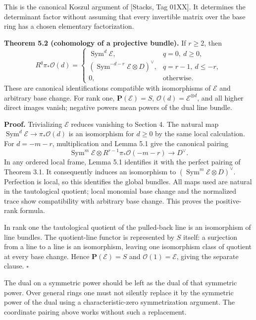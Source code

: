 \documentclass[11pt]{article}
\begin{document}
This is the canonical Koszul argument of {[}Stacks, Tag 01XX{]}. It
determines the determinant factor without assuming that every invertible
matrix over the base ring has a chosen elementary factorization.

\textbf{Theorem 5.2 (cohomology of a projective bundle).} If \(r\ge2\),
then \[
R^q\pi_*\mathcal O(d)=
\begin{cases}
\operatorname{Sym}^d\mathcal E,&q=0,\ d\ge0,\\
(\operatorname{Sym}^{-d-r}\mathcal E\otimes D)^\vee,
&q=r-1,\ d\le-r,\\
0,&\text{otherwise}.
\end{cases}
\] These are canonical identifications compatible with isomorphisms of
\(\mathcal E\) and arbitrary base change. For rank one,
\(\mathbf P(\mathcal E)=S\), \(\mathcal O(d)=\mathcal E^{\otimes d}\),
and all higher direct images vanish; negative powers mean powers of the
dual line bundle.

\textbf{Proof.} Trivializing \(\mathcal E\) reduces vanishing to Section
4. The natural map
\(\operatorname{Sym}^d\mathcal E\to\pi_*\mathcal O(d)\) is an
isomorphism for \(d\ge0\) by the same local calculation. For \(d=-m-r\),
multiplication and Lemma 5.1 give the canonical pairing \[
\operatorname{Sym}^m\mathcal E\otimes
R^{r-1}\pi_*\mathcal O(-m-r)\longrightarrow D^\vee.
\] In any ordered local frame, Lemma 5.1 identifies it with the perfect
pairing of Theorem 3.1. It consequently induces an isomorphism to
\((\operatorname{Sym}^m\mathcal E\otimes D)^\vee\). Perfection is local,
so this identifies the global bundles. All maps used are natural in the
tautological quotient; local monomial base change and the normalized
trace show compatibility with arbitrary base change. This proves the
positive-rank formula.

In rank one the tautological quotient of the pulled-back line is an
isomorphism of line bundles. The quotient-line functor is represented by
\(S\) itself: a surjection from a line to a line is an isomorphism,
leaving one isomorphism class of quotient at every base change. Hence
\(\mathbf P(\mathcal E)=S\) and \(\mathcal O(1)=\mathcal E\), giving the
separate clause. \(\square\)

The dual on a symmetric power should be left as the dual of that
symmetric power. Over general rings one must not silently replace it by
the symmetric power of the dual using a characteristic-zero
symmetrization argument. The coordinate pairing above works without such
a replacement.
\end{document}
